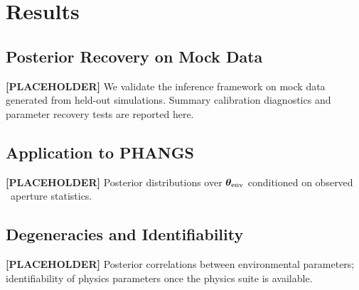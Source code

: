 \section{Results}
\label{sec:results}

\subsection{Posterior Recovery on Mock Data}

\textbf{[PLACEHOLDER]} We validate the inference framework on mock data generated
from held-out simulations. Summary calibration diagnostics and parameter recovery
tests are reported here.

\subsection{Application to PHANGS}

\textbf{[PLACEHOLDER]} Posterior distributions over $\boldsymbol{\theta}_{\rm env}$ conditioned on
observed \PHANGS\ aperture statistics.

\subsection{Degeneracies and Identifiability}

\textbf{[PLACEHOLDER]} Posterior correlations between environmental parameters;
identifiability of physics parameters once the physics suite is available.
